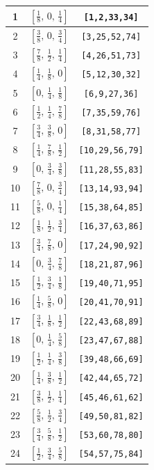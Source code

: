 \documentclass[fleqn,8pt]{jsarticle}
\begin{document}
\begin{longtable}{ccc}
1 & $\left[ \frac{1}{8},\, 0,\, \frac{1}{4} \right]$ & {\tt [1,2,33,34]} \\ \hline
2 & $\left[ \frac{3}{8},\, 0,\, \frac{3}{4} \right]$ & {\tt [3,25,52,74]} \\ \hline
3 & $\left[ \frac{7}{8},\, \frac{1}{2},\, \frac{1}{4} \right]$ & {\tt [4,26,51,73]} \\ \hline
4 & $\left[ \frac{1}{4},\, \frac{1}{8},\, 0 \right]$ & {\tt [5,12,30,32]} \\ \hline
5 & $\left[ 0,\, \frac{1}{4},\, \frac{1}{8} \right]$ & {\tt [6,9,27,36]} \\ \hline
6 & $\left[ \frac{1}{2},\, \frac{1}{4},\, \frac{7}{8} \right]$ & {\tt [7,35,59,76]} \\ \hline
7 & $\left[ \frac{3}{4},\, \frac{3}{8},\, 0 \right]$ & {\tt [8,31,58,77]} \\ \hline
8 & $\left[ \frac{1}{4},\, \frac{7}{8},\, \frac{1}{2} \right]$ & {\tt [10,29,56,79]} \\ \hline
9 & $\left[ 0,\, \frac{3}{4},\, \frac{3}{8} \right]$ & {\tt [11,28,55,83]} \\ \hline
10 & $\left[ \frac{7}{8},\, 0,\, \frac{3}{4} \right]$ & {\tt [13,14,93,94]} \\ \hline
11 & $\left[ \frac{5}{8},\, 0,\, \frac{1}{4} \right]$ & {\tt [15,38,64,85]} \\ \hline
12 & $\left[ \frac{1}{8},\, \frac{1}{2},\, \frac{3}{4} \right]$ & {\tt [16,37,63,86]} \\ \hline
13 & $\left[ \frac{3}{4},\, \frac{7}{8},\, 0 \right]$ & {\tt [17,24,90,92]} \\ \hline
14 & $\left[ 0,\, \frac{3}{4},\, \frac{7}{8} \right]$ & {\tt [18,21,87,96]} \\ \hline
15 & $\left[ \frac{1}{2},\, \frac{3}{4},\, \frac{1}{8} \right]$ & {\tt [19,40,71,95]} \\ \hline
16 & $\left[ \frac{1}{4},\, \frac{5}{8},\, 0 \right]$ & {\tt [20,41,70,91]} \\ \hline
17 & $\left[ \frac{3}{4},\, \frac{1}{8},\, \frac{1}{2} \right]$ & {\tt [22,43,68,89]} \\ \hline
18 & $\left[ 0,\, \frac{1}{4},\, \frac{5}{8} \right]$ & {\tt [23,47,67,88]} \\ \hline
19 & $\left[ \frac{1}{2},\, \frac{1}{4},\, \frac{3}{8} \right]$ & {\tt [39,48,66,69]} \\ \hline
20 & $\left[ \frac{1}{4},\, \frac{3}{8},\, \frac{1}{2} \right]$ & {\tt [42,44,65,72]} \\ \hline
21 & $\left[ \frac{3}{8},\, \frac{1}{2},\, \frac{1}{4} \right]$ & {\tt [45,46,61,62]} \\ \hline
22 & $\left[ \frac{5}{8},\, \frac{1}{2},\, \frac{3}{4} \right]$ & {\tt [49,50,81,82]} \\ \hline
23 & $\left[ \frac{3}{4},\, \frac{5}{8},\, \frac{1}{2} \right]$ & {\tt [53,60,78,80]} \\ \hline
24 & $\left[ \frac{1}{2},\, \frac{3}{4},\, \frac{5}{8} \right]$ & {\tt [54,57,75,84]} \\
\end{longtable}
\end{document}
